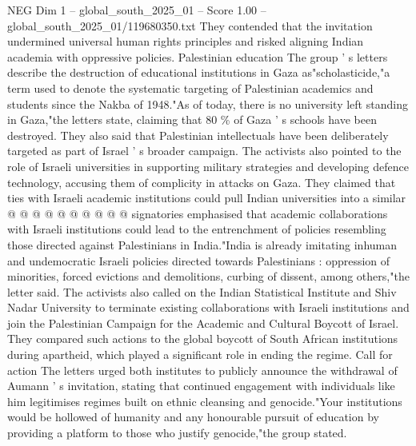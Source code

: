 \begin{textsample}{NEG Dim 1 – global\_south\_2025\_01 – Score 1.00 – global\_south\_2025\_01/119680350.txt}
They contended that the invitation undermined universal human rights principles and risked aligning Indian academia with oppressive policies.
Palestinian education The group ' s letters describe the destruction of educational institutions in Gaza as"scholasticide,"a term used to denote the systematic targeting of Palestinian academics and students since the Nakba of 1948."As of today, there is no university left standing in Gaza,"the letters state, claiming that 80 \% of Gaza ' s schools have been destroyed.
They also said that Palestinian intellectuals have been deliberately targeted as part of Israel ' s broader campaign.
The activists also pointed to the role of Israeli universities in supporting military strategies and developing defence technology, accusing them of complicity in attacks on Gaza.
They claimed that ties with Israeli academic institutions could pull Indian universities into a similar @ @ @ @ @ @ @ @ @ @ signatories emphasised that academic collaborations with Israeli institutions could lead to the entrenchment of policies resembling those directed against Palestinians in India."India is already imitating inhuman and undemocratic Israeli policies directed towards Palestinians : oppression of minorities, forced evictions and demolitions, curbing of dissent, among others,"the letter said.
The activists also called on the Indian Statistical Institute and Shiv Nadar University to terminate existing collaborations with Israeli institutions and join the Palestinian Campaign for the Academic and Cultural Boycott of Israel.
They compared such actions to the global boycott of South African institutions during apartheid, which played a significant role in ending the regime.
Call for action The letters urged both institutes to publicly announce the withdrawal of Aumann ' s invitation, stating that continued engagement with individuals like him legitimises regimes built on ethnic cleansing and genocide."Your institutions would be hollowed of humanity and any honourable pursuit of education by providing a platform to those who justify genocide,"the group stated.

\end{textsample}
